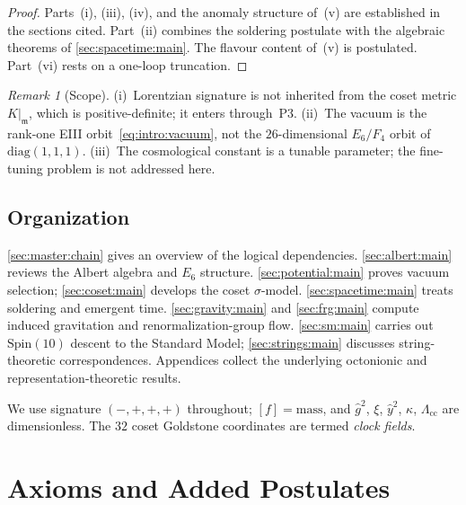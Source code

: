 \documentclass[11pt]{article}
\theoremstyle{plain}
\theoremstyle{definition}
\theoremstyle{remark}
\newtheorem{remark}[theorem]{Remark}
\begin{document}
\begin{proof}
Parts~(i), (iii), (iv), and the anomaly structure of~(v) are established in the
sections cited. Part~(ii) combines the soldering postulate with the algebraic
theorems of \autoref{sec:spacetime:main}. The flavour content of~(v) is
postulated. Part~(vi) rests on a one-loop truncation.
\end{proof}

\begin{remark}[Scope]\label{rem:intro:caveats}
(i)~Lorentzian signature is not inherited from the coset metric $K|_{\mathfrak{m}}$,
which is positive-definite; it enters through~\textnormal{P3}.
(ii)~The vacuum is the rank-one EIII orbit~\eqref{eq:intro:vacuum}, not the
$26$-dimensional $E_6/F_4$ orbit of $\mathrm{diag}(1,1,1)$.
(iii)~The cosmological constant is a tunable parameter; the fine-tuning problem is
not addressed here.
\end{remark}

\subsection{Organization}
\label{sec:intro:roadmap}

\autoref{sec:master:chain} gives an overview of the logical dependencies.
\autoref{sec:albert:main} reviews the Albert algebra and $E_6$ structure.
\autoref{sec:potential:main} proves vacuum selection; \autoref{sec:coset:main}
develops the coset $\sigma$-model. \autoref{sec:spacetime:main} treats soldering
and emergent time. \autoref{sec:gravity:main} and \autoref{sec:frg:main} compute
induced gravitation and renormalization-group flow. \autoref{sec:sm:main}
carries out $\mathrm{Spin}(10)$ descent to the Standard Model;
\autoref{sec:strings:main} discusses string-theoretic correspondences. Appendices
collect the underlying octonionic and representation-theoretic results.

We use signature $(-,+,+,+)$ throughout; $[f]=\mathrm{mass}$, and
$\hat g^{2}$, $\xi$, $\hat y^{2}$, $\kappa$, $\Lambda_{\mathrm{cc}}$ are
dimensionless. The $32$ coset Goldstone coordinates are termed \emph{clock fields}.%
\section{Axioms and Added Postulates}
\label{sec:axioms:main}
\end{document}
